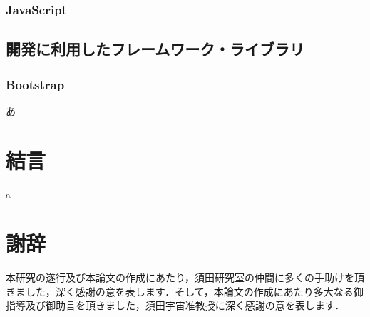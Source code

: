 \documentclass[12pt,a4j,titlepage]{ltjsarticle}
\begin{document}
\subsubsection{JavaScript}

\subsection{開発に利用したフレームワーク・ライブラリ}
\subsubsection{Bootstrap}
あ

\clearpage

\section{結言}%
a
\clearpage

\section{謝辞}%
本研究の遂行及び本論文の作成にあたり，須田研究室の仲間に多くの手助けを頂きました，深く感謝の意を表します．そして，本論文の作成にあたり多大なる御指導及び御助言を頂きました，須田宇宙准教授に深く感謝の意を表します．
\clearpage
\end{document}
